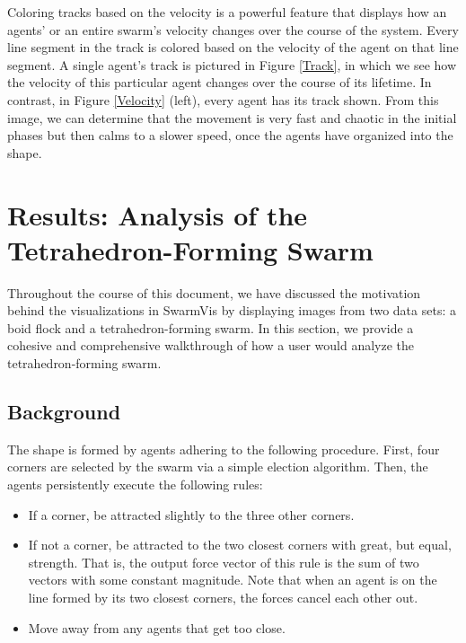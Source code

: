 \documentclass[conference]{IEEEtran}
\begin{document}
Coloring tracks based on the velocity is a powerful feature that displays how an agents' or an entire swarm's
velocity changes over the course of the system.
Every line segment in the track is colored based on the velocity of the agent on that line segment.
A single agent's track is pictured in Figure \ref{Track}, in which we see how the velocity of this particular agent changes
over the course of its lifetime.
In contrast, in Figure \ref{Velocity} (left), every agent has its track shown.
From this image, we can determine that the movement is very fast and chaotic in the initial phases but then calms to a slower
speed, once the agents have organized into the shape.

\section{Results: Analysis of the Tetrahedron-Forming Swarm}

Throughout the course of this document, we have discussed the motivation behind the visualizations in SwarmVis by
displaying images from two data sets: a boid flock and a tetrahedron-forming swarm.
In this section, we provide a cohesive and comprehensive walkthrough of how a user would
analyze the tetrahedron-forming swarm.

\subsection{Background}

The shape is formed by agents adhering to the following procedure.
First, four corners are selected by the swarm via a simple election algorithm.
Then, the agents persistently execute the following rules:
\begin{itemize}
	\item If a corner, be attracted slightly to the three other corners.
	\item If not a corner, be attracted to the two closest corners with great, but equal, strength.
	That is, the output force vector of this rule is the sum of two vectors with some constant magnitude.
	Note that when an agent is on the line formed by its two closest corners, the forces cancel each other out.
	\item Move away from any agents that get too close.
\end{itemize}
\end{document}
